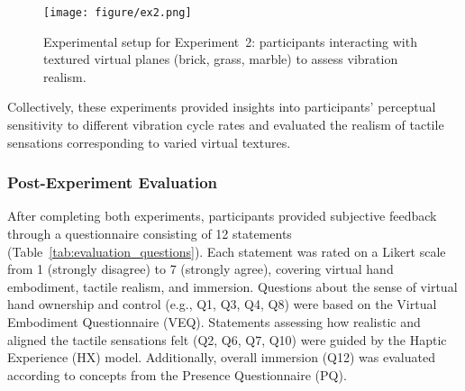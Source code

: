 \documentclass[graybox]{svmult}
\begin{document}
\begin{figure}[H]
	\centering
	\texttt{[image: figure/ex2.png]}%
	\caption{Experimental setup for Experiment~2: participants interacting with textured virtual planes (brick, grass, marble) to assess vibration realism.}\label{fig:experiment2_setup}
\end{figure}

Collectively, these experiments provided insights into participants' perceptual sensitivity to different vibration cycle rates and evaluated the realism of tactile sensations corresponding to varied virtual textures.

\subsubsection{Post-Experiment Evaluation}
After completing both experiments, participants provided subjective feedback through a questionnaire consisting of 12 statements (Table~\ref{tab:evaluation_questions}). Each statement was rated on a Likert scale from 1 (strongly disagree) to 7 (strongly agree), covering virtual hand embodiment, tactile realism, and immersion. Questions about the sense of virtual hand ownership and control (e.g., Q1, Q3, Q4, Q8) were based on the Virtual Embodiment Questionnaire (VEQ). Statements assessing how realistic and aligned the tactile sensations felt (Q2, Q6, Q7, Q10) were guided by the Haptic Experience (HX) model. Additionally, overall immersion (Q12) was evaluated according to concepts from the Presence Questionnaire (PQ).
\end{document}
